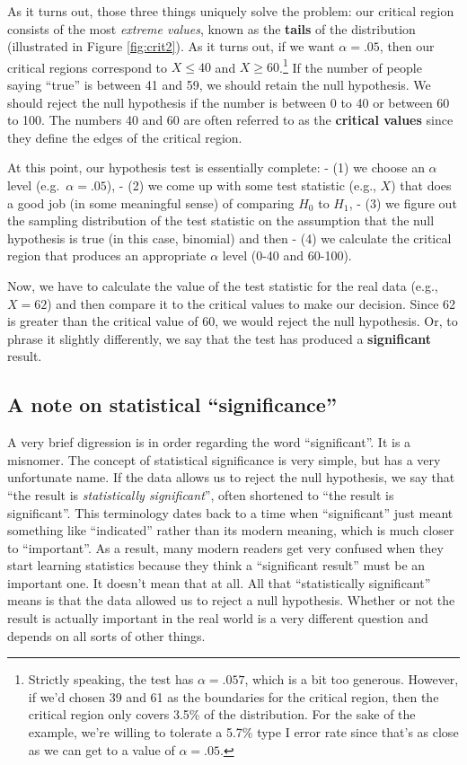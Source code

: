\documentclass[
]{book}
\theoremstyle{definition}
\theoremstyle{definition}
\theoremstyle{definition}
\theoremstyle{definition}
\theoremstyle{remark}
\begin{document}
As it turns out, those three things uniquely solve the problem: our critical region consists of the most \emph{extreme values}, known as the \textbf{tails} of the distribution (illustrated in Figure \ref{fig:crit2}). As it turns out, if we want \(\alpha = .05\), then our critical regions correspond to \(X \leq 40\) and \(X \geq 60\).\footnote{Strictly speaking, the test has \(\alpha = .057\), which is a bit too generous. However, if we'd chosen 39 and 61 as the boundaries for the critical region, then the critical region only covers 3.5\% of the distribution. For the sake of the example, we're willing to tolerate a 5.7\% type I error rate since that's as close as we can get to a value of \(\alpha = .05\).} If the number of people saying ``true'' is between 41 and 59, we should retain the null hypothesis. We should reject the null hypothesis if the number is between 0 to 40 or between 60 to 100. The numbers 40 and 60 are often referred to as the \textbf{critical values} since they define the edges of the critical region.

At this point, our hypothesis test is essentially complete:
- (1) we choose an \(\alpha\) level (e.g.~\(\alpha = .05\)),
- (2) we come up with some test statistic (e.g., \(X\)) that does a good job (in some meaningful sense) of comparing \(H_0\) to \(H_1\),
- (3) we figure out the sampling distribution of the test statistic on the assumption that the null hypothesis is true (in this case, binomial) and then
- (4) we calculate the critical region that produces an appropriate \(\alpha\) level (0-40 and 60-100).

Now, we have to calculate the value of the test statistic for the real data (e.g., \(X = 62\)) and then compare it to the critical values to make our decision. Since 62 is greater than the critical value of 60, we would reject the null hypothesis. Or, to phrase it slightly differently, we say that the test has produced a \textbf{significant} result.

\hypertarget{a-note-on-statistical-significance}{%
\subsection{A note on statistical ``significance''}\label{a-note-on-statistical-significance}}

A very brief digression is in order regarding the word ``significant''. It is a misnomer. The concept of statistical significance is very simple, but has a very unfortunate name. If the data allows us to reject the null hypothesis, we say that ``the result is \emph{statistically significant}'', often shortened to ``the result is significant''. This terminology dates back to a time when ``significant'' just meant something like ``indicated'' rather than its modern meaning, which is much closer to ``important''. As a result, many modern readers get very confused when they start learning statistics because they think a ``significant result'' must be an important one. It doesn't mean that at all. All that ``statistically significant'' means is that the data allowed us to reject a null hypothesis. Whether or not the result is actually important in the real world is a very different question and depends on all sorts of other things.
\end{document}
